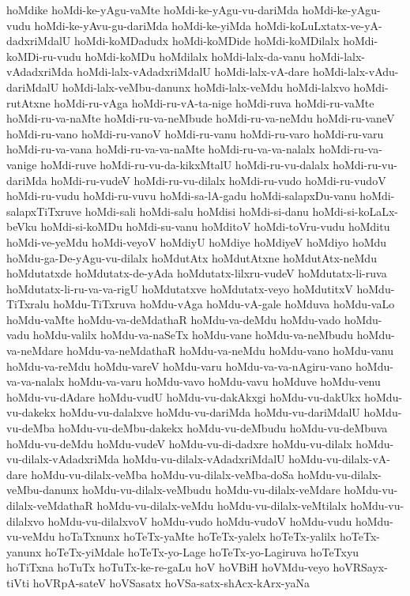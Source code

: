 {hoMdike
hoMdi-ke-yAgu-vaMte
hoMdi-ke-yAgu-vu-dariMda
hoMdi-ke-yAgu-vudu
hoMdi-ke-yAvu-gu-dariMda
hoMdi-ke-yiMda
hoMdi-koLuLxtatx-ve-yA-dadxriMdalU
hoMdi-koMDadudx
hoMdi-koMDide
hoMdi-koMDilalx
hoMdi-koMDi-ru-vudu
hoMdi-koMDu
hoMdilalx
hoMdi-lalx-da-vanu
hoMdi-lalx-vAdadxriMda
hoMdi-lalx-vAdadxriMdalU
hoMdi-lalx-vA-dare
hoMdi-lalx-vAdu-dariMdalU
hoMdi-lalx-veMbu-danunx
hoMdi-lalx-veMdu
hoMdi-lalxvo
hoMdi-rutAtxne
hoMdi-ru-vAga
hoMdi-ru-vA-ta-nige
hoMdi-ruva
hoMdi-ru-vaMte
hoMdi-ru-va-naMte
hoMdi-ru-va-neMbude
hoMdi-ru-va-neMdu
hoMdi-ru-vaneV
hoMdi-ru-vano
hoMdi-ru-vanoV
hoMdi-ru-vanu
hoMdi-ru-varo
hoMdi-ru-varu
hoMdi-ru-va-vana
hoMdi-ru-va-va-naMte
hoMdi-ru-va-va-nalalx
hoMdi-ru-va-vanige
hoMdi-ruve
hoMdi-ru-vu-da-kikxMtalU
hoMdi-ru-vu-dalalx
hoMdi-ru-vu-dariMda
hoMdi-ru-vudeV
hoMdi-ru-vu-dilalx
hoMdi-ru-vudo
hoMdi-ru-vudoV
hoMdi-ru-vudu
hoMdi-ru-vuvu
hoMdi-sa-lA-gadu
hoMdi-salapxDu-vanu
hoMdi-salapxTiTxruve
hoMdi-sali
hoMdi-salu
hoMdisi
hoMdi-si-danu
hoMdi-si-koLaLx-beVku
hoMdi-si-koMDu
hoMdi-su-vanu
hoMditoV
hoMdi-toVru-vudu
hoMditu
hoMdi-ve-yeMdu
hoMdi-veyoV
hoMdiyU
hoMdiye
hoMdiyeV
hoMdiyo
hoMdu
hoMdu-ga-De-yAgu-vu-dilalx
hoMdutAtx
hoMdutAtxne
hoMdutAtx-neMdu
hoMdutatxde
hoMdutatx-de-yAda
hoMdutatx-lilxru-vudeV
hoMdutatx-li-ruva
hoMdutatx-li-ru-va-va-rigU
hoMdutatxve
hoMdutatx-veyo
hoMdutitxV
hoMdu-TiTxralu
hoMdu-TiTxruva
hoMdu-vAga
hoMdu-vA-gale
hoMduva
hoMdu-vaLo
hoMdu-vaMte
hoMdu-va-deMdathaR
hoMdu-va-deMdu
hoMdu-vado
hoMdu-vadu
hoMdu-valilx
hoMdu-va-naSeTx
hoMdu-vane
hoMdu-va-neMbudu
hoMdu-va-neMdare
hoMdu-va-neMdathaR
hoMdu-va-neMdu
hoMdu-vano
hoMdu-vanu
hoMdu-va-reMdu
hoMdu-vareV
hoMdu-varu
hoMdu-va-va-nAgiru-vano
hoMdu-va-va-nalalx
hoMdu-va-varu
hoMdu-vavo
hoMdu-vavu
hoMduve
hoMdu-venu
hoMdu-vu-dAdare
hoMdu-vudU
hoMdu-vu-dakAkxgi
hoMdu-vu-dakUkx
hoMdu-vu-dakekx
hoMdu-vu-dalalxve
hoMdu-vu-dariMda
hoMdu-vu-dariMdalU
hoMdu-vu-deMba
hoMdu-vu-deMbu-dakekx
hoMdu-vu-deMbudu
hoMdu-vu-deMbuva
hoMdu-vu-deMdu
hoMdu-vudeV
hoMdu-vu-di-dadxre
hoMdu-vu-dilalx
hoMdu-vu-dilalx-vAdadxriMda
hoMdu-vu-dilalx-vAdadxriMdalU
hoMdu-vu-dilalx-vA-dare
hoMdu-vu-dilalx-veMba
hoMdu-vu-dilalx-veMba-doSa
hoMdu-vu-dilalx-veMbu-danunx
hoMdu-vu-dilalx-veMbudu
hoMdu-vu-dilalx-veMdare
hoMdu-vu-dilalx-veMdathaR
hoMdu-vu-dilalx-veMdu
hoMdu-vu-dilalx-veMtilalx
hoMdu-vu-dilalxvo
hoMdu-vu-dilalxvoV
hoMdu-vudo
hoMdu-vudoV
hoMdu-vudu
hoMdu-vu-veMdu
hoTaTxnunx
hoTeTx-yaMte
hoTeTx-yalelx
hoTeTx-yalilx
hoTeTx-yanunx
hoTeTx-yiMdale
hoTeTx-yo-Lage
hoTeTx-yo-Lagiruva
hoTeTxyu
hoTiTxna
hoTuTx
hoTuTx-ke-re-gaLu
hoV
hoVBiH
hoVMdu-veyo
hoVRSayx-tiVti
hoVRpA-sateV
hoVSasatx
hoVSa-satx-shAcx-kArx-yaNa
}
